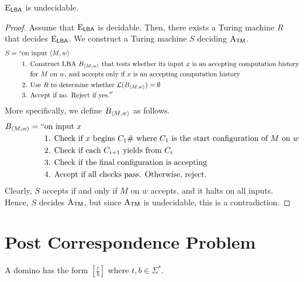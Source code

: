 \begin{theorem}
    $\mathrm{E}_{\mathsf{LBA}}$ is undecidable.
\end{theorem}

\begin{proof}
    Assume that $\mathrm{E}_{\mathsf{LBA}}$ is decidable. Then, there exists a Turing machine $R$ that decides $\mathrm{E}_{\mathsf{LBA}}$. We construct a Turing machine $S$ deciding $\mathrm{A}_{\mathsf{TM}}$.
    $$
    \begin{aligned}
        S = 
            `` &\text{on input $\langle M,w \rangle$} \\
            &
            \begin{aligned}
                \text{1. } &\text{Construct LBA $B_{\langle M,w \rangle}$ that tests whether its input $x$ is an accepting computation history} \\
                &\text{for $M$ on $w$, and accepts only if $x$ is an accepting computation history}
            \end{aligned} \\
            &\text{2. Use $R$ to determine whether $\mathcal{L}(B_{\langle M,w \rangle}) = \emptyset$} \\
            &\text{3. Accept if no. Reject if yes.}
            ''
    \end{aligned}
    $$
    More specifically, we define $B_{\langle M,w \rangle}$ as follows.
    $$
    \begin{aligned}
        B_{\langle M,w \rangle} = 
        `` &\text{on input $x$} \\
        &\text{1. Check if $x$ begins $C_1 \#$ where $C_1$ is the start configuration of $M$ on $w$} \\
        &\text{2. Check if each $C_{i+1}$ yields from $C_i$ } \\
        &\text{3. Check if the final configuration is accepting} \\
        &\text{4. Accept if all checks pass. Otherwise, reject.}
    \end{aligned}
    $$
    Clearly, $S$ accepts if and only if $M$ on $w$ accepts, and it halts on all inputs. Hence, $S$ decides $\mathrm{A}_{\mathsf{TM}}$, but since $\mathrm{A}_{\mathsf{TM}}$ is undecidable, this is a contradiction.
\end{proof}

\section{Post Correspondence Problem}

A domino has the form $\displaystyle \left[ \frac{t}{b} \right] $ where $t, b \in \Sigma^*$.

